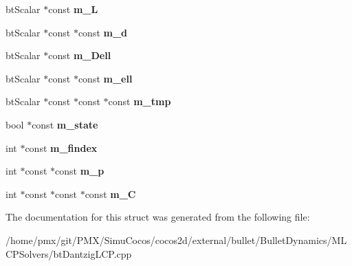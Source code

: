 \begin{DoxyCompactItemize}
\item 
\mbox{\label{structbtLCP_a3c564417864dd18fe487d4e49b8666ec}} 
bt\+Scalar $\ast$const {\bfseries m\+\_\+L}
\item 
\mbox{\label{structbtLCP_a78fbbc01b23f5f9e37d73653dc6ba75b}} 
bt\+Scalar $\ast$const $\ast$const {\bfseries m\+\_\+d}
\item 
\mbox{\label{structbtLCP_a7236e12b27304697136aebf726da726a}} 
bt\+Scalar $\ast$const {\bfseries m\+\_\+\+Dell}
\item 
\mbox{\label{structbtLCP_a52629c175f180aa86d966e21c13648a9}} 
bt\+Scalar $\ast$const $\ast$const {\bfseries m\+\_\+ell}
\item 
\mbox{\label{structbtLCP_aa4b88ed1357c6b8455bddfcf217a4881}} 
bt\+Scalar $\ast$const $\ast$const $\ast$const {\bfseries m\+\_\+tmp}
\item 
\mbox{\label{structbtLCP_a177c7bb2e8b2ac4a200e5ad675c258d3}} 
bool $\ast$const {\bfseries m\+\_\+state}
\item 
\mbox{\label{structbtLCP_a5295ef7e1ffa36784a58aa19387804de}} 
int $\ast$const {\bfseries m\+\_\+findex}
\item 
\mbox{\label{structbtLCP_a8639bff9e8a3a8089d23bc79b9662495}} 
int $\ast$const $\ast$const {\bfseries m\+\_\+p}
\item 
\mbox{\label{structbtLCP_a6eb0424fda803fe87963911b48c6f826}} 
int $\ast$const $\ast$const $\ast$const {\bfseries m\+\_\+C}
\end{DoxyCompactItemize}


The documentation for this struct was generated from the following file\+:\begin{DoxyCompactItemize}
\item 
/home/pmx/git/\+P\+M\+X/\+Simu\+Cocos/cocos2d/external/bullet/\+Bullet\+Dynamics/\+M\+L\+C\+P\+Solvers/bt\+Dantzig\+L\+C\+P.\+cpp\end{DoxyCompactItemize}
